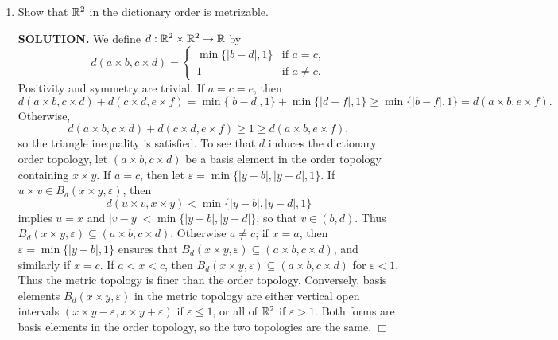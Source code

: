 \documentclass{article}
\begin{document}
\begin{enumerate}
\begin{enumerate}
        {\bf SOLUTION.} Similarly, we observe that
        $$\rho(\mathbf{x}, \mathbf{y}) \leq d'(\mathbf{x}, \mathbf{y}) \leq n^\frac1p \rho(\mathbf{x}, \mathbf{y}).$$        
        Again, we will that that $d'$ induces the same topology as $\rho$ using Lemma 2.59. Given a ball $B_\rho(\mathbf{x}, \varepsilon)$, let $\delta = \varepsilon$, so that $d'(\mathbf{x}, \mathbf{y}) < \delta$ implies 
        $$\rho(\mathbf{x}, \mathbf{y}) \leq d'(\mathbf{x}, \mathbf{y}) < \varepsilon.$$
        Given a ball $B_{d'}(\mathbf{x}, \varepsilon)$, let $\delta = \frac{\varepsilon}{n^\frac1p}$. Then if $\rho(\mathbf{x}, \mathbf{y}) < \delta$,
        $$d'(\mathbf{x}, \mathbf{y}) \leq n^\frac1p \rho(\mathbf{x}, \mathbf{y}) < \varepsilon.$$
        Hence $d', \rho$ induce the standard topology on $\reals^n$. $\Box$
    \end{enumerate}

    \item Show that $\mathbb{R}^2$ in the dictionary order is metrizable.

    {\bf SOLUTION.} We define $d: \mathbb{R}^2 \times \mathbb{R}^2 \rightarrow \mathbb{R}$ by
    $$d(a \times b, c \times d) = \begin{cases}
        \min\{|b-d|, 1\} &\text{if } a = c, \\
        1 &\text{if } a \neq c.
    \end{cases}$$
    Positivity and symmetry are trivial. If $a = c = e$, then
    $$d(a \times b, c \times d) + d(c \times d, e \times f) = \min\{|b - d|, 1\} + \min\{|d - f|, 1\} \geq \min\{|b - f|, 1\} = d(a \times b, e \times f).$$
    Otherwise,
    $$d(a \times b, c \times d) + d(c \times d, e \times f) \geq 1 \geq d(a \times b, e \times f),$$
    so the triangle inequality is satisfied. To see that $d$ induces the dictionary order topology, let $(a \times b, c \times d)$ be a basis element in the order topology containing $x \times y$. If $a = c$, then let $\varepsilon = \min\{|y - b|, |y - d|, 1\}$. If $u \times v \in B_d(x \times y, \varepsilon)$, then 
    $$d(u \times v, x \times y) < \min\{|y - b|, |y - d|, 1\}$$
    implies $u = x$ and $|v - y| < \min\{|y - b|, |y - d|\}$, so that $v \in (b, d)$. Thus $B_d(x \times y, \varepsilon) \subseteq (a \times b, c \times d)$. Otherwise $a \neq c$; if $x = a$, then $\varepsilon = \min\{|y - b|, 1\}$ ensures that $B_d(x \times y, \varepsilon) \subseteq (a \times b, c \times d)$, and similarly if $x = c$. If $a < x < c$, then $B_d(x \times y, \varepsilon) \subseteq (a \times b, c \times d)$ for $\varepsilon < 1$. Thus the metric topology is finer than the order topology. Conversely, basis elements $B_d(x \times y, \varepsilon)$ in the metric topology are either vertical open intervals $(x \times y - \varepsilon, x \times y + \varepsilon)$ if $\varepsilon \leq 1$, or all of $\mathbb{R}^2$ if $\varepsilon > 1$. Both forms are basis elements in the order topology, so the two topologies are the same. $\Box$


\end{enumerate}
\end{document}
